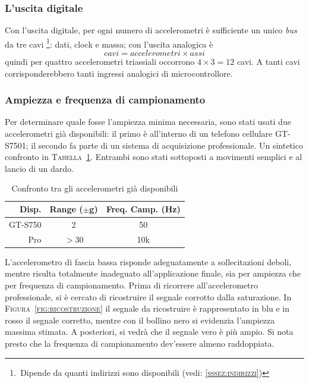     \subsubsection {L'uscita digitale} \label{sssez:digitale}	
    Con l'uscita digitale, per ogni numero di accelerometri
    è sufficiente un unico \textit{bus} da tre cavi
	\footnote{\,Dipende da quanti indirizzi sono disponibili
	(vedi: \textsc{\ref{sssez:indirizzi}})}:
	dati, clock e massa;
    con l'uscita analogica è
\[
	cavi = accelerometri \times assi
\]
    quindi per quattro accelerometri triassiali occorrono
    \(4 \times 3  = 12\) cavi.
    A tanti cavi corrisponderebbero tanti ingressi analogici di microcontrollore.
    

    \subsubsection {Ampiezza e frequenza di campionamento} \label{sssez:accmax}
    Per determinare quale fosse l'ampiezza minima necessaria,
    sono stati usati due accelerometri già disponibili:
    il primo è all'interno di un telefono cellulare { GT-S7501};
    il secondo fa parte di un sistema di acquisizione professionale.
    Un sintetico confronto in { \textsc{Tabella~\ref{tab:accelerometricasa}}}.
    Entrambi sono stati sottoposti a movimenti semplici e
    al lancio di un dardo.
	\begin{table}
	  \begin{center}
		\caption{Confronto tra gli accelerometri già disponibili}
		\label{tab:accelerometricasa}
		\begin{tabular}{r c c}
Disp.   & Range ($\pm$g) & Freq. Camp. (Hz)\\
			\hline
GT-S750 & 2              & 50 \\
Pro     & $>$30          & 10k \\
			\hline
		\end{tabular}
	  \end{center}
	\end{table}

    L'accelerometro di fascia bassa risponde adeguatamente a sollecitazioni deboli,
    mentre risulta totalmente inadeguato all'applicazione finale,
    sia per ampiezza che per frequenza di campionamento.
    Prima di ricorrere all'accelerometro professionale,
    si è cercato di ricostruire il segnale corrotto dalla saturazione.
    In \textsc{Figura~\ref{fig:ricostruzione}}
    il segnale da ricostruire è rappresentato in blu e
    in rosso il segnale corretto, mentre
    con il bollino nero si evidenzia l'ampiezza massima stimata.
    A posteriori, si vedrà che il segnale vero è più ampio.
    Si nota presto che la frequenza di campionamento
    dev'essere almeno raddoppiata.

